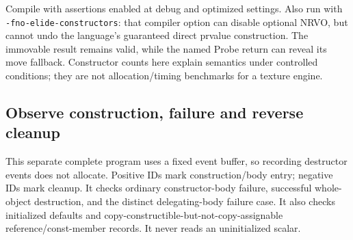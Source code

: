 Compile with assertions enabled at debug and optimized settings. Also run with \texttt{-fno-elide-constructors}: that compiler option can disable optional NRVO, but cannot undo the language's guaranteed direct prvalue construction. The immovable result remains valid, while the named Probe return can reveal its move fallback. Constructor counts here explain semantics under controlled conditions; they are not allocation/timing benchmarks for a texture engine.

\subsection{Observe construction, failure and reverse cleanup}\label{01-foundations-i-ch004-observe-construction-failure-and-reverse-cleanup}

This separate complete program uses a fixed event buffer, so recording destructor events does not allocate. Positive IDs mark construction/body entry; negative IDs mark cleanup. It checks ordinary constructor-body failure, successful whole-object destruction, and the distinct delegating-body failure case. It also checks initialized defaults and copy-constructible-but-not-copy-assignable reference/const-member records. It never reads an uninitialized scalar.

